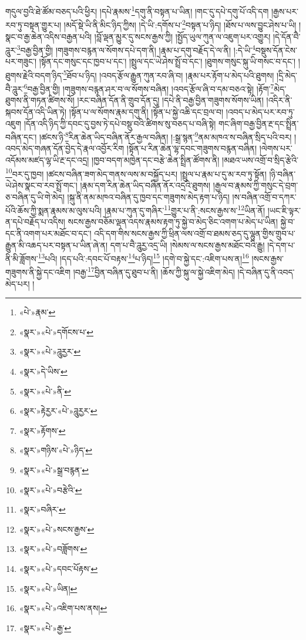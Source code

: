 གདུལ་བྱའི་ཐེ་ཚོམ་བཅད་པའི་ཕྱིར། །དཔེ་རྣམས་\footnote{«པེ་»རྣམ་}དགུ་ནི་བསྟན་པ་ཡིན། །གང་དུ་དཔེ་དགུ་པོ་འདི་དག །རྒྱས་པར་རབ་ཏུ་བསྟན་གྱུར་པ། །མདོ་སྡེ་ཡི་ནི་མིང་ཉིད་ཀྱིས། །དེ་ཡི་:དགོས་པ་\footnote{«སྣར་»«པེ་»དགོངས་པ་}བསྟན་པ་ཉིད། །ཐོས་པ་ལས་བྱུང་ཤེས་པ་ཡི། །སྣང་བ་རྒྱ་ཆེན་འདིས་བརྒྱན་པའི། །བློ་ལྡན་མྱུར་དུ་སངས་རྒྱས་ཀྱི། །སྤྱོད་ཡུལ་ཀུན་ལ་འཇུག་པར་འགྱུར། །དེ་དོན་བཻ་ཌཱུར་\footnote{«སྣར་»«པེ་»ཌཱུརྱར་}བརྒྱ་བྱིན་གྱི། །གཟུགས་བརྙན་ལ་སོགས་དཔེ་དག་ནི། །རྣམ་པ་དགུ་བརྗོད་དེ་ལ་ནི། །:དེ་ཡི་\footnote{«སྣར་»དེ་ཡིས་}བསྡུས་དོན་ངེས་པར་གཟུང་། །སྟོན་དང་གསུང་དང་ཁྱབ་པ་དང་། །སྤྲུལ་དང་ཡེ་ཤེས་སྤྲོ་བ་དང་། །ཐུགས་གསུང་སྐུ་ཡི་གསང་བ་དང་། །ཐུགས་རྗེའི་བདག་ཉིད་\footnote{«སྣར་»«པེ་»ནི་}ཐོབ་པ་ཉིད། །འབད་རྩོལ་རྒྱུན་ཀུན་རབ་ཞི་བ། །རྣམ་པར་རྟོག་པ་མེད་པའི་ཐུགས། །དྲི་མེད་བཻ་ཌཱུར་\footnote{«སྣར་»རྟེརྱར་«པེ་»ཌཱུརྱར་}བརྒྱ་བྱིན་གྱི། །གཟུགས་བརྙན་ཤར་བ་ལ་སོགས་བཞིན། །འབད་རྩོལ་ཞི་བ་དམ་བཅའ་སྟེ། །རྟོག་\footnote{«སྣར་»རྟོགས་}མེད་ཐུགས་ནི་གཏན་ཚིགས་སོ། །རང་བཞིན་དོན་ནི་གྲུབ་དོན་དུ། །དཔེ་ནི་བརྒྱ་བྱིན་གཟུགས་སོགས་ཡིན། །འདིར་ནི་སྐབས་དོན་འདི་ཡིན་ཏེ། །སྟོན་པ་ལ་སོགས་རྣམ་དགུ་ནི། །སྟོན་པ་སྐྱེ་འཆི་དང་བྲལ་བ། །འབད་པ་མེད་པར་རབ་ཏུ་འཇུག །དོན་འདི་ཉིད་ཀྱི་དབང་དུ་བྱས་ཏེ་དཔེ་བསྡུ་བའི་ཚིགས་སུ་བཅད་པ་བཞི་སྟེ། གང་ཞིག་བརྒྱ་བྱིན་རྔ་དང་སྤྲིན་བཞིན་དང་། །ཚངས་ཉི་\footnote{«སྣར་»གཉིས་«པེ་»ཉིད་}རིན་ཆེན་ཡིད་བཞིན་ནོར་རྒྱལ་བཞིན། །:སྒྲ་སྙན་\footnote{«སྣར་»«པེ་»སྒྲ་བརྙན་}ནམ་མཁའ་ས་བཞིན་སྲིད་པའི་བར། །འབད་མེད་གཞན་དོན་བྱེད་དེ་རྣལ་འབྱོར་རིག །སྟོན་པ་རིན་ཆེན་ལྷ་དབང་གཟུགས་བརྙན་བཞིན། །ལེགས་པར་འདོམས་མཛད་ལྷ་ཡི་རྔ་དང་འདྲ། །ཁྱབ་བདག་མཁྱེན་དང་བརྩེ་ཆེན་སྤྲིན་ཚོགས་ནི། །མཐའ་ཡས་འགྲོ་བ་སྲིད་རྩེའི་\footnote{«སྣར་»«པེ་»བརྩེའི་}བར་དུ་ཁྱབ། །ཚངས་བཞིན་ཟག་མེད་གནས་ལས་མ་བསྐྱོད་པར། །སྤྲུལ་པ་རྣམ་པ་དུ་མ་རབ་ཏུ་སྟོན། །ཉི་བཞིན་ཡེ་ཤེས་སྣང་བ་རབ་སྤྲོ་གང་། །རྣམ་དག་རིན་ཆེན་ཡིད་བཞིན་ནོར་འདྲའི་ཐུགས། །རྒྱལ་བ་རྣམས་ཀྱི་གསུང་དེ་བྲག་ཅ་བཞིན་དུ་ཡི་གེ་མེད། །སྐུ་ནི་ནམ་མཁའ་བཞིན་དུ་ཁྱབ་དང་གཟུགས་མེད་རྟག་པ་ཉིད། །ས་བཞིན་འགྲོ་བ་དཀར་པོའི་ཆོས་ཀྱི་སྨན་རྣམས་མ་ལུས་པའི། །རྣམ་པ་ཀུན་དུ་གཞིར་\footnote{«སྣར་»བཞིར་}གྱུར་པ་ནི་:སངས་རྒྱས་ས་\footnote{«སྣར་»«པེ་»སངས་རྒྱས་}ཡིན་ནོ། །ཡང་ཇི་ལྟར་ན་དཔེ་བརྗོད་པ་འདིས། སངས་རྒྱས་བཅོམ་ལྡན་འདས་རྣམས་རྟག་ཏུ་སྐྱེ་བ་མེད་ཅིང་འགག་པ་མེད་པ་ཡིན། སྐྱེ་བ་དང་ནི་འགག་པར་མཐོང་བ་དང་། འདི་དག་གིས་སངས་རྒྱས་ཀྱི་ཕྲིན་ལས་འགྲོ་བ་ཐམས་ཅད་དུ་ལྷུན་གྱིས་གྲུབ་པ་རྒྱུན་མི་འཆད་པར་བསྟན་པ་ཡིན་ཞེ་ན། དག་པ་བཻ་ཌཱུརྱ་འདྲ་ཡི། །སེམས་ལ་སངས་རྒྱས་མཐོང་བའི་རྒྱུ། །དེ་དག་པ་ནི་མི་ཟློགས་\footnote{«སྣར་»«པེ་»བཟློགས་}པའི། །དད་པའི་:དབང་པོ་བརྟས་\footnote{«སྣར་»«པེ་»དབང་པོརྟས་}པ་ཉིད།\footnote{«སྣར་»«པེ་»ཡིན།} །དགེ་བ་སྐྱེ་དང་:འཇིག་པས་ན།\footnote{«སྣར་»«པེ་»འཇིག་པས་ནས།} །སངས་རྒྱས་གཟུགས་ནི་སྐྱེ་དང་འཇིག །བརྒྱ་\footnote{«སྣར་»«པེ་»རྒྱ་}བྱིན་བཞིན་དུ་ཐུབ་པ་ནི། །ཆོས་ཀྱི་སྐུ་ལ་སྐྱེ་འཇིག་མེད། །དེ་བཞིན་དུ་ནི་འབད་མེད་པར། །
